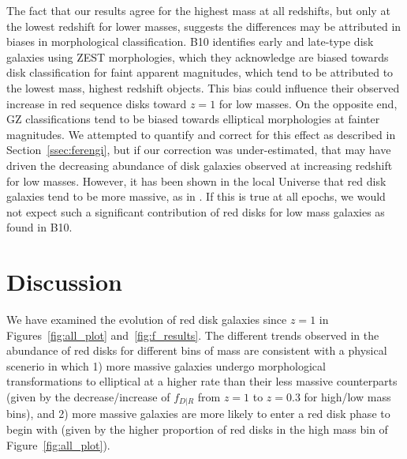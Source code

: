 \documentclass[useAMS,usenatbib]{mn2e}
\begin{document}
The fact that our results agree for the highest mass at all redshifts, but only at the lowest redshift for lower masses, suggests the differences may be attributed in biases in morphological classification. B10 identifies early and late-type disk galaxies using ZEST \citep{Scarlata2007} morphologies, which they acknowledge are biased towards disk classification for faint apparent magnitudes, which tend to be attributed to the lowest mass, highest redshift objects. This bias could influence their observed increase in red sequence disks toward $z=1$ for low masses. On the opposite end, GZ classifications tend to be biased towards elliptical morphologies at fainter magnitudes. We attempted to quantify and correct for this effect as described in Section~\ref{ssec:ferengi}, but if our correction was under-estimated, that may have driven the decreasing abundance of disk galaxies observed at increasing redshift for low masses. However, it has been shown in the local Universe that red disk galaxies tend to be more massive, as in \citet{Masters2011}. If this is true at all epochs, we would not expect such a significant contribution of red disks for low mass galaxies as found in B10.

\section{Discussion}
\label{sec:discussion}
We have examined the evolution of red disk galaxies since $z=1$ in Figures~\ref{fig:all_plot} and~\ref{fig:f_results}. The different trends observed in the abundance of red disks for different bins of mass are consistent with a physical scenerio in which 1) more massive galaxies undergo morphological transformations to elliptical at a higher rate than their less massive counterparts (given by the decrease/increase of $f_{D|R}$ from $z=1$ to $z=0.3$ for high/low mass bins), and 2) more massive galaxies are more likely to enter a red disk phase to begin with (given by the higher proportion of red disks in the high mass bin of Figure~\ref{fig:all_plot}). 
\end{document}
